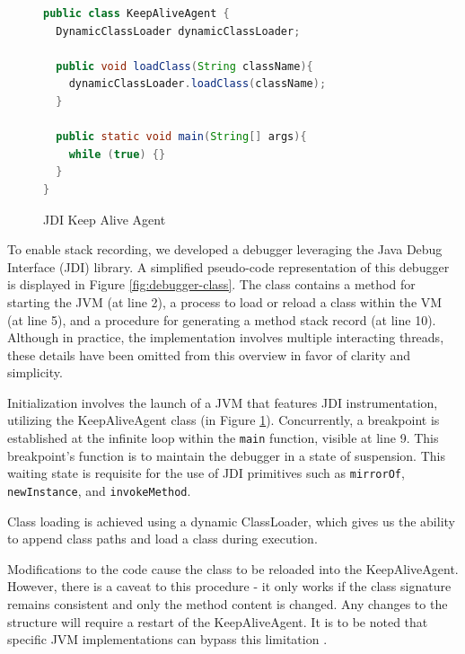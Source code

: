 \documentclass[english,submission]{programming}
\newcommand{\code}[1]{\colorbox{codegray}{\texttt{#1}}}
\begin{document}
\begin{figure}[htbp]
  \centering
  \begin{lstlisting}[language=Java]
public class KeepAliveAgent {
  DynamicClassLoader dynamicClassLoader;

  public void loadClass(String className){
    dynamicClassLoader.loadClass(className);
  }

  public static void main(String[] args){
    while (true) {}
  }
}
  \end{lstlisting}
  \caption{JDI Keep Alive Agent}
  \label{fig:java-keep-alive-agent}
\end{figure}

To enable stack recording, we developed a debugger leveraging the Java Debug Interface (JDI) library. 
A simplified pseudo-code representation of this debugger is displayed in Figure \ref{fig:debugger-class}. 
The class contains a method for starting the JVM (at line 2), a process to load or reload a class within the VM (at line 5), and a procedure for generating a method stack record (at line 10). 
Although in practice, the implementation involves multiple interacting threads, these details have been omitted from this overview in favor of clarity and simplicity.

Initialization involves the launch of a JVM that features JDI instrumentation, utilizing the KeepAliveAgent class (in Figure \ref{fig:java-keep-alive-agent}). 
Concurrently, a breakpoint is established at the infinite loop within the \code{main} function, visible at line 9. 
This breakpoint's function is to maintain the debugger in a state of suspension. This waiting state is requisite for the use of JDI primitives such as \code{mirrorOf}, \code{newInstance}, and \code{invokeMethod}.

Class loading is achieved using a dynamic ClassLoader, which gives us the ability to append class paths and load a class during execution. 

Modifications to the code cause the class to be reloaded into the KeepAliveAgent.
However, there is a caveat to this procedure - it only works if the class signature remains consistent and only the method content is changed. 
Any changes to the structure will require a restart of the KeepAliveAgent. 
It is to be noted that specific JVM implementations can bypass this limitation \cite{}.
\end{document}

